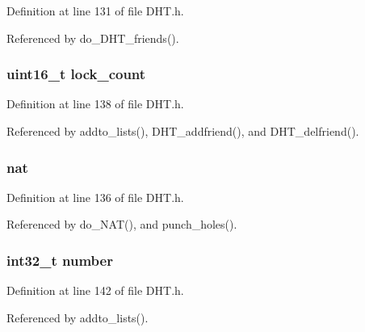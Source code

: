 Definition at line 131 of file D\+H\+T.\+h.



Referenced by do\+\_\+\+D\+H\+T\+\_\+friends().

\hypertarget{struct_d_h_t___friend_a712c4c639bfc0f5a8616eead3e24ca4e}{
\subsubsection[{lock\+\_\+count}]{\setlength{\rightskip}{0pt plus 5cm}uint16\+\_\+t lock\+\_\+count}}\label{struct_d_h_t___friend_a712c4c639bfc0f5a8616eead3e24ca4e}


Definition at line 138 of file D\+H\+T.\+h.



Referenced by addto\+\_\+lists(), D\+H\+T\+\_\+addfriend(), and D\+H\+T\+\_\+delfriend().

\hypertarget{struct_d_h_t___friend_a96318690475243d010825feb2a67b41c}{
\subsubsection[{nat}]{ nat}}\label{struct_d_h_t___friend_a96318690475243d010825feb2a67b41c}


Definition at line 136 of file D\+H\+T.\+h.



Referenced by do\+\_\+\+N\+A\+T(), and punch\+\_\+holes().

\hypertarget{struct_d_h_t___friend_a875e6b85754551c9eaea424a5a4c7934}{
\subsubsection[{number}]{\setlength{\rightskip}{0pt plus 5cm}int32\+\_\+t number}}\label{struct_d_h_t___friend_a875e6b85754551c9eaea424a5a4c7934}


Definition at line 142 of file D\+H\+T.\+h.



Referenced by addto\+\_\+lists().

